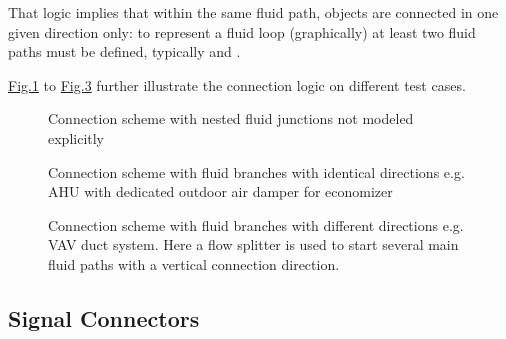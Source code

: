 \documentclass[letterpaper,10pt, openany,english]{sphinxmanual}
\begin{document}
That logic implies that within the same fluid path, objects are connected in one given direction only: to represent a fluid loop (graphically) at least two fluid paths must be defined, typically  and .

\hyperref[\detokenize{requirements:linkage-connect-multi}]{Fig.\@ \ref{\detokenize{requirements:linkage-connect-multi}}} to \hyperref[\detokenize{requirements:linkage-connect-duct}]{Fig.\@ \ref{\detokenize{requirements:linkage-connect-duct}}} further illustrate the connection logic on different test cases.

\begin{figure}[htbp]
\centering
\capstart

\noindent{}
\caption{Connection scheme with nested fluid junctions not modeled explicitly}\label{\detokenize{requirements:linkage-connect-multi}}\end{figure}

\begin{figure}[htbp]
\centering
\capstart

\noindent{}
\caption{Connection scheme with fluid branches with identical directions e.g. AHU with dedicated outdoor air damper for economizer}\label{\detokenize{requirements:linkage-connect-dedicated}}\end{figure}

\begin{figure}[htbp]
\centering
\capstart

\noindent{}
\caption{Connection scheme with fluid branches with different directions e.g. VAV duct system. Here a flow splitter is used to start several main fluid paths with a vertical connection direction.}\label{\detokenize{requirements:linkage-connect-duct}}\end{figure}


\subsection{Signal Connectors}
\label{\detokenize{requirements:signal-connectors}}\label{\detokenize{requirements:sec-signal-connectors}}
\end{document}
